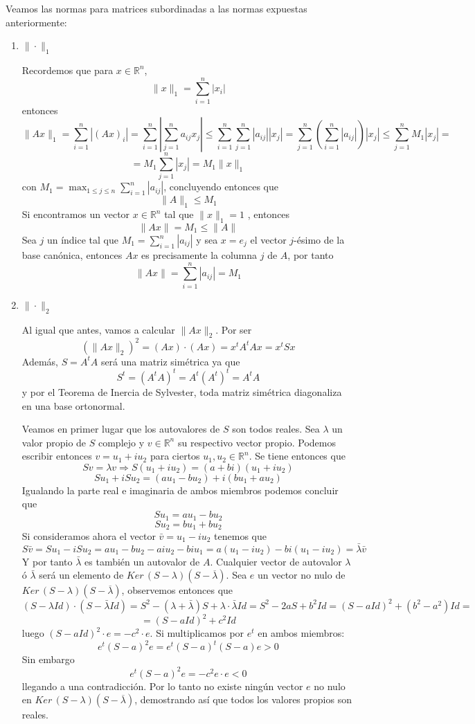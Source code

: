     \begin{ejem}
    Veamos las normas para matrices subordinadas a las normas expuestas anteriormente:
    \begin{enumerate}
        \item $\|\cdot\|_1$

        Recordemos que para $x \in \mathbb R^n$, $$\|x\|_1=\sum_{i=1}^n |x_i|$$
        entonces
        $$\|Ax\|_1=\sum_{i=1}^n |(Ax)_i|=\sum_{i=1}^n \left|\sum_{j=1}^n a_{ij} x_j \right|\leq \sum_{i=1}^n \sum_{j=1}^n |a_{ij}| |x_j| =\sum_{j=1}^n \left(\sum_{i=1}^n |a_{ij}|\right) |x_j| \leq \sum_{j=1}^n M_1 |x_j| =$$$$=M_1\sum_{j=1}^n |x_j|=M_1\|x\|_1$$
        con $\displaystyle M_1=\max_{1\leq j\leq n}\sum_{i=1}^n|a_{ij}|$, concluyendo entonces que
        $$\|A\|_1\leq M_1$$
        Si encontramos un vector $x \in \mathbb R^n$ tal que $\|x\|_1=1$ , entonces
        $$\|Ax\|=M_1 \leq \|A\|$$
        Sea $j$ un índice tal que $\displaystyle M_1=\sum_{i=1}^n |a_{ij}|$ y sea $x=e_j$ el vector $j$-ésimo de la base canónica, entonces $Ax$ es precisamente la columna $j$ de $A$, por tanto
        $$\|Ax\|=\sum_{i=1}^n|a_{ij}|=M_1$$
         \item $\|\cdot\|_2$

        Al igual que antes, vamos a calcular $\|Ax\|_2$. Por ser
        \begin{equation} \label{eq:2.1}
            (\|Ax\|_2)^2=(Ax)\cdot (Ax)=x^tA^tAx=x^tSx
        \end{equation}
        Además, $S=A^tA$ será una matriz simétrica ya que
        $$S^t=(A^tA)^t=A^t(A^t)^t=A^tA$$
        y por el Teorema de Inercia de Sylvester, toda matriz simétrica diagonaliza en una base ortonormal.

        Veamos en primer lugar que los autovalores de $S$ son todos reales. Sea $\lambda$ un valor propio de $S$ complejo y $v\in\mathbb{R}^n$ su respectivo vector propio. Podemos escribir entonces $v=u_1+iu_2$ para ciertos $u_1,u_2\in\mathbb{R}^n$. Se tiene entonces que
        $$Sv=\lambda v\Rightarrow S(u_1+iu_2)=(a+bi)(u_1+iu_2)$$
        $$Su_1+iSu_2=(au_1-bu_2)+i(bu_1+au_2)$$
        Igualando la parte real e imaginaria de ambos miembros podemos concluir que
        $$Su_1=au_1-bu_2$$
        $$Su_2=bu_1+bu_2$$
        Si consideramos ahora el vector $\bar{v}=u_1-iu_2$ tenemos que
        $$S\bar{v}=Su_1-iSu_2=au_1-bu_2-aiu_2-biu_1=a(u_1-iu_2)-bi(u_1-iu_2)=\bar{\lambda}\bar{v}$$
        Y por tanto $\bar{\lambda}$ es también un autovalor de $A$. Cualquier vector de autovalor $\lambda$ ó  $\bar{\lambda}$ será un elemento de $Ker\,(S-\lambda)(S-\overline{\lambda})$. Sea $e$ un vector no nulo de $Ker\,(S-\lambda)(S-\overline{\lambda})$, observemos entonces que
        $$(S-\lambda Id)\cdot (S-\bar{\lambda}Id)=S^2-(\lambda+\bar{\lambda})S+\lambda\cdot\bar{\lambda}Id=S^2-2aS+b^2Id=(S-aId)^2+(b^2-a^2)Id=$$
        $$=(S-aId)^2+c^2Id$$
        luego $(S-aId)^2\cdot e=-c^2\cdot e$. Si multiplicamos por $e^t$ en ambos miembros:
        $$e^t(S-a)^2e=e^t(S-a)^t(S-a)e>0$$
        Sin embargo 
        $$e^t(S-a)^2e=-c^2 e\cdot e <0$$
        llegando a una contradicción. Por lo tanto no existe ningún vector $e$ no nulo en $Ker\,(S-\lambda)(S-\overline{\lambda})$, demostrando así que todos los valores propios son reales.


\end{enumerate}
\end{ejem}
